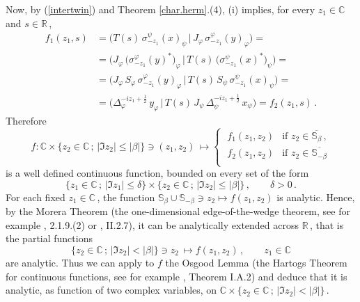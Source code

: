 \documentclass[reqno]{amsart}
\theoremstyle{definition}
\theoremstyle{remark}
\numberwithin{equation}{section}
\theoremstyle{plain}
\begin{document}
Now, by (\ref{intertwin}) and Theorem \ref{char.herm}.(4), (i) implies,
for every $z_1\in\mathbb C$ and $s\in\mathbb R\,$,
\begin{align*}
f_1(z_1,s) &= \big( T(s)\,\sigma^\psi_{-z_1}(x)_\psi\, |\,
J_\varphi\,\sigma^\varphi_{-z_1}(y)_\varphi\big) =\\
&=\big( J_\varphi\,\big( \sigma^\varphi_{-z_1}(y)^*\big)_\varphi
\, |\, T(s)\,\big( \sigma^\psi_{-z_1}(x)^*\big)_\psi \big) =\\
&=\big( J_\varphi\, S_\varphi\,\sigma^\varphi_{-z_1}(y)_\varphi
\, |\, T(s)\, S_\psi\,\sigma^\psi_{-z_1}(x)_\psi \big) =\\
&=\big( \Delta_\varphi^{-i z_1 +\frac 12}\, y_\varphi\, |\,
T(s)\, J_\psi\,\Delta_\psi^{-i z_1 +\frac 12}\, x_\psi \big)
=f_2(z_1,s)\, .
\end{align*}
Therefore
\begin{equation*}
f : \mathbb C\times \big\{ z_2\in\mathbb C\, ;\, |\Im z_2 |\leq
|\beta |\big\} \ni (z_1,z_2)\,\longmapsto \begin{cases}
\; f_1(z_1,z_2) &\text{if $z_2\in\overline{\mathbb S_\beta}\,$,} \\
\; f_2(z_1,z_2) &\text{if $z_2\in\overline{\mathbb S_{-\beta}}$} \\
\end{cases}
\end{equation*}
is a well defined continuous function, bounded on every set of the
form
\begin{equation*}
\big\{ z_1\in\mathbb C\, ;\, |\Im z_1 |\leq\delta \big\}\times
\big\{ z_2\in\mathbb C\, ;\, |\Im z_2 |\leq |\beta |\big\}\, ,
\qquad \delta >0\, .
\end{equation*}
For each fixed $z_1\in\mathbb C\,$, the function $\mathbb S_\beta
\cup \mathbb S_{-\beta}\ni z_2\longmapsto f(z_1,z_2)$ is analytic.
Hence, by the Morera Theorem (the one-dimensional edge-of-the-wedge
theorem, see for example \cite{Ber-Gay}, 2.1.9.(2) or \cite{Car},
II.2.7), it can be analytically extended across $\mathbb R\,$,
that is the partial functions
\begin{equation*}
\big\{ z_2\in\mathbb C\, ;\, |\Im z_2 | <|\beta |\big\}\ni z_2\,
\longmapsto f(z_1,z_2)\, ,\qquad z_1\in\mathbb C
\end{equation*}
are analytic. Thus we can apply to $f$ the Osgood Lemma (the
Hartogs Theorem for continuous functions, see for example
\cite{G-R}, Theorem I.A.2) and deduce that it is analytic, as
function of two complex variables, on $\mathbb C\times
\big\{ z_2\in\mathbb C\, ;\, |\Im z_2 | <|\beta |\big\}\,$.
\end{document}
